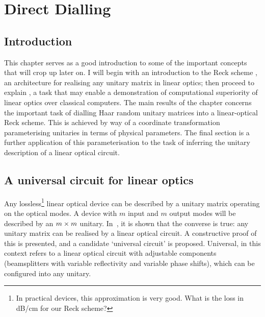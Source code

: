 \chapter{Direct Dialling}
\label{ch:DirectDialling}

\section{Introduction}
\label{sec:DDIntro}
This chapter serves as a good introduction to some of the important concepts
that will crop up later on. I will begin with an introduction to the Reck
scheme \cite{reck94}, an architecture for realising any unitary matrix in linear
optics; then proceed to explain \bosonsampling{} \cite{bosonsampling}, a task
that may enable a demonstration of computational superiority of linear optics
over classical computers. The main results of the chapter concerns the important
task of dialling Haar random unitary matrices into a linear-optical Reck scheme.
This is achieved by way of a coordinate transformation parameterising unitaries
in terms of physical parameters. The final section is a further application of
this parameterisation to the task of inferring the unitary description of a
linear optical circuit.

\section{A universal circuit for linear optics}
\label{sec:ReckScheme}
Any lossless\footnote{In practical devices, this approximation is very good.
What is the loss in dB/cm for our Reck scheme?} linear optical device can be
described by a unitary matrix operating on the optical modes. A device with
\(m\) input and \(m\) output modes will be described by an \(m \times m\) unitary.
In~\cite{reck94}, it is shown that the converse is true: any unitary matrix can
be realised by a linear optical circuit. A constructive proof of this is
presented, and a candidate `universal circuit' is proposed. Universal, in this
context refers to a linear optical circuit with adjustable components
(beamsplitters with variable reflectivity and variable phase shifts), which can
be configured into any unitary.

